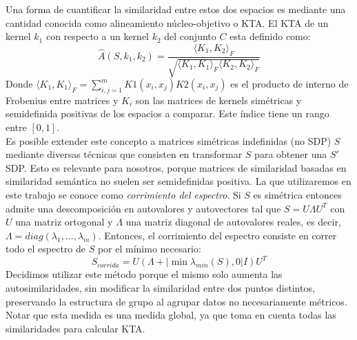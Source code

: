 Una forma de cuantificar la similaridad entre estos dos espacios es mediante una cantidad conocida como alineamiento núcleo-objetivo o KTA. El KTA de un kernel $k_1$ con respecto a un kernel $k_2$ del conjunto $C$ esta definido como:
\begin{equation}
	\hat{A}(S, k_1, k_2) = \frac{\langle K_1, K_2 \rangle _F}{\sqrt{\langle K_1, K_1 \rangle _F \langle K_2, K_2 \rangle _F}}
\end{equation}
Donde $\langle K_1, K_1 \rangle _F = \sum_{i,j=1}^m K1(x_i, x_j)K2(x_i, x_j)$ es el producto de interno de Frobenius entre matrices y $K_i$ son las matrices de kernels simétricas y semidefinida positivas de los espacios a comparar. Este índice tiene un rango entre $[0, 1]$.\cite{Cristianini2006}\\
Es posible extender este concepto a matrices simétricas indefinidas (no SDP) $S$ mediante diversas técnicas que consisten en transformar $S$ para obtener una $S'$ SDP. Esto es relevante para nosotros, porque matrices de similaridad basadas en similaridad semántica no suelen ser semidefinidas positiva. La que utilizaremos en este trabajo se conoce como \textit{corrimiento del espectro}. Si $S$ es simétrica entonces admite una descomposición en autovalores y autovectores tal que $S=U\Lambda U^T$ con $U$ una matriz ortogonal y $\Lambda$ una matriz diagonal de autovalores reales, es decir, $\Lambda = diag(\lambda _1,...,\lambda _m)$. Entonces, el corrimiento del espectro consiste en correr todo el espectro de $S$ por el mínimo necesario: 
\begin{equation}
	S_{corrida} = U(\Lambda + |\min{\lambda _{min}(S), 0}|I)U^T 
	\label{eq:matriz_corrida}
\end{equation}
Decidimos utilizar este método porque el mismo solo aumenta las autosimilaridades, sin modificar la similaridad entre dos puntos distintos, preservando la estructura de grupo al agrupar datos no necesariamente métricos.\cite{Chen22009}\\
Notar que esta medida es una medida global, ya que toma en cuenta todas las similaridades para calcular KTA.\\
